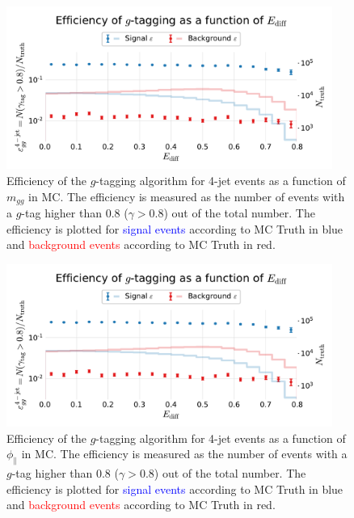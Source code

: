 \begin{figure}
  \centerfloat
  \includegraphics[width=0.95\textwidth, trim=10 10 10 50, clip, page=5]{figures/quarks/efficiency_events-down_sample=1.00-ML_vars=vertex-selection=b-ejet_min=4-n_iter_RS_lgb=99-n_iter_RS_xgb=9-cdot_cut=0.90-version=19-njet=4.pdf}
  \caption[$g$-Tagging Efficiency for 4-Jet Events in MC as a Function of $m_{gg}$]
          {Efficiency of the $g$-tagging algorithm for 4-jet events as a function of $m_{gg}$  in MC. The efficiency is measured as the number of events with a $g$-tag higher than 0.8 ($\gamma > 0.8$) out of the total number. The efficiency is plotted for \textcolor{blue}{signal events} according to MC Truth in blue and \textcolor{red}{background events} according to MC Truth in red.
          } 
  \label{fig:q:effiency_gtag_m_gg}
\end{figure}
\begin{figure}
  \centerfloat
  \includegraphics[width=0.95\textwidth, trim=10 10 10 50, clip, page=6]{figures/quarks/efficiency_events-down_sample=1.00-ML_vars=vertex-selection=b-ejet_min=4-n_iter_RS_lgb=99-n_iter_RS_xgb=9-cdot_cut=0.90-version=19-njet=4.pdf}
  \caption[$g$-Tagging Efficiency for 4-Jet Events in MC as a Function of $\phi_\mathrm{\parallel}$]
          {Efficiency of the $g$-tagging algorithm for 4-jet events as a function of $\phi_\mathrm{\parallel}$  in MC. The efficiency is measured as the number of events with a $g$-tag higher than 0.8 ($\gamma > 0.8$) out of the total number. The efficiency is plotted for \textcolor{blue}{signal events} according to MC Truth in blue and \textcolor{red}{background events} according to MC Truth in red.
          } 
  \label{fig:q:effiency_gtag_phi_planes}
\end{figure}
